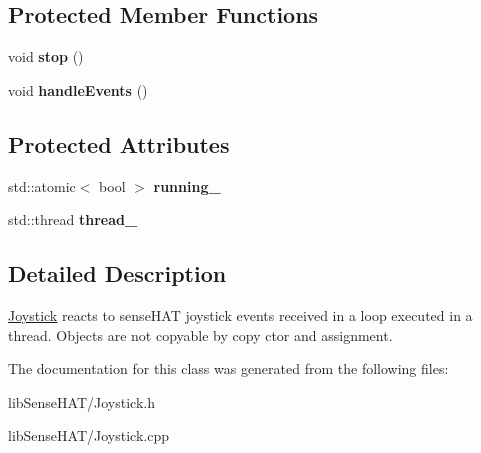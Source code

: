\subsection*{Protected Member Functions}
\begin{DoxyCompactItemize}
\item 
\mbox{\label{class_joystick_a663bef4817dc643d2e54fe5083ae6177}} 
void {\bfseries stop} ()
\item 
\mbox{\label{class_joystick_a5fa4903e3722b1e374db191dc75a1383}} 
void {\bfseries handle\+Events} ()
\end{DoxyCompactItemize}
\subsection*{Protected Attributes}
\begin{DoxyCompactItemize}
\item 
\mbox{\label{class_joystick_a3d79892eee022da43bee5658daeec7bd}} 
std\+::atomic$<$ bool $>$ {\bfseries running\+\_\+}
\item 
\mbox{\label{class_joystick_a885c832d840018ec59c82f081fa18060}} 
std\+::thread {\bfseries thread\+\_\+}
\end{DoxyCompactItemize}


\subsection{Detailed Description}
\mbox{\hyperlink{class_joystick}{Joystick}} reacts to sense\+H\+AT joystick events received in a loop executed in a thread. Objects are not copyable by copy ctor and assignment. 

The documentation for this class was generated from the following files\+:\begin{DoxyCompactItemize}
\item 
lib\+Sense\+H\+A\+T/Joystick.\+h\item 
lib\+Sense\+H\+A\+T/Joystick.\+cpp\end{DoxyCompactItemize}
